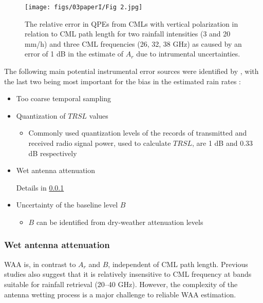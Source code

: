 \documentclass{ctuthesis}\usepackage[]{graphicx}\usepackage[]{color}
\begin{document}
\begin{figure}[h]
\begin{center}
\texttt{[image: figs/03paperI/Fig 2.jpg]}
\caption{The relative error in QPEs from CMLs with vertical polarization in relation to CML path length for two rainfall intensities (3 and 20 mm/h) and three CML frequencies (26, 32, 38 GHz) as caused by an error of 1 dB in the estimate of $A_r$ due to intrumental uncertainties.} \label{2The1}
\end{center}
\end{figure}

The following main potential instrumental error sources were identified by \cite{leijnseErrorsUncertaintiesMicrowave2010}, with the last two being most important for the bias in the estimated rain rates \citep{chwalaCommercialMicrowaveLink2019}: 
\begin{itemize}
        \item Too coarse temporal sampling
        \item Quantization of $T\!R\!S\!L$ values 
        \begin{itemize}
                \item Commonly used quantization levels of the records of transmitted and received radio signal power, used to calculate $T\!R\!S\!L$, are 1 dB and 0.33 dB respectively
        \end{itemize}
        \item Wet antenna attenuation
        \begin{itemize}
                Details in \ref{WAAtheor}
        \end{itemize}
        \item Uncertainty of the baseline level $B$
        \begin{itemize}
                \item $B$ can be identified from dry-weather attenuation levels
        \end{itemize}
\end{itemize}




\subsubsection{Wet antenna attenuation} \label{WAAtheor}

WAA is, in contrast to $A_r$ and $B$, independent of CML path length. Previous studies \citep{leijnseMicrowaveLinkRainfall2008, overeemMeasuringUrbanRainfall2011} also suggest that it is relatively insensitive to CML frequency at bands suitable for rainfall retrieval (20--40 GHz). However, the complexity of the antenna wetting process is a major challenge to reliable WAA estimation. 
\end{document}
